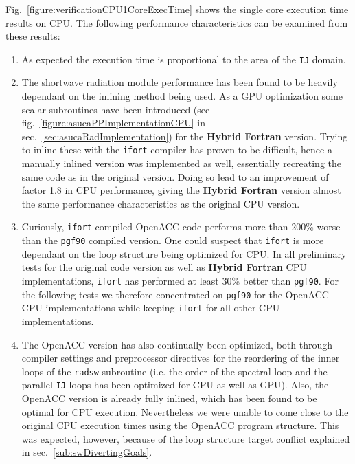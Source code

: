 Fig.~\ref{figure:verificationCPU1CoreExecTime} shows the single core execution time results on CPU. The following performance characteristics can be examined from these results:
\begin{enumerate}
 \item As expected the execution time is proportional to the area of the \verb|IJ| domain. 
 \item The shortwave radiation module performance has been found to be heavily dependant on the inlining method being used. As a GPU optimization some scalar subroutines have been introduced (see fig.~\ref{figure:asucaPPImplementationCPU} in sec.~\ref{sec:asucaRadImplementation}) for the \textbf{Hybrid Fortran} version. Trying to inline these with the \verb|ifort| compiler has proven to be difficult, hence a manually inlined version was implemented as well, essentially recreating the same code as in the original version. Doing so lead to an improvement of factor 1.8 in CPU performance, giving the \textbf{Hybrid Fortran} version almost the same performance characteristics as the original CPU version.
 \item Curiously, \verb|ifort| compiled OpenACC code performs more than 200\% worse than the \verb|pgf90| compiled version. One could suspect that \verb|ifort| is more dependant on the loop structure being optimized for CPU. In all preliminary tests for the original code version as well as \textbf{Hybrid Fortran} CPU implementations, \verb|ifort| has performed at least 30\% better than \verb|pgf90|. For the following tests we therefore concentrated on \verb|pgf90| for the OpenACC CPU implementations while keeping \verb|ifort| for all other CPU implementations.
 \item The OpenACC version has also continually been optimized, both through compiler settings and preprocessor directives for the reordering of the inner loops of the \verb|radsw| subroutine (i.e. the order of the spectral loop and the parallel \verb|IJ| loops has been optimized for CPU as well as GPU). Also, the OpenACC version is already fully inlined, which has been found to be optimal for CPU execution. Nevertheless we were unable to come close to the original CPU execution times using the OpenACC program structure. This was expected, however, because of the loop structure target conflict explained in sec.~\ref{sub:swDivertingGoals}.
\end{enumerate}

